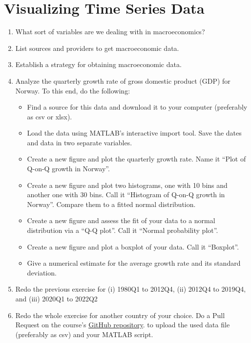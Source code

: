 \section[Visualizing Time Series Data]{Visualizing Time Series Data\label{ex:VisualizingTimeSeriesData}}

\begin{enumerate}
\item What sort of variables are we dealing with in macroeconomics?
\item List sources and providers to get macroeconomic data.
\item Establish a strategy for obtaining macroeconomic data.
\item Analyze the quarterly growth rate of gross domestic product (GDP) for Norway.
To this end, do the following:
\begin{itemize}
	\item Find a source for this data and download it to your computer (preferably as csv or xlsx).
	\item Load the data using MATLAB's interactive import tool. Save the dates and data in two separate variables.
	\item Create a new figure and plot the quarterly growth rate.
	Name it \enquote{Plot of Q-on-Q growth in Norway}.
	\item Create a new figure and plot two histograms, one with 10 bins and another one with 30 bins.
	Call it \enquote{Histogram of Q-on-Q growth in Norway}. Compare them to a fitted normal distribution.
	\item Create a new figure and assess the fit of your data to a normal distribution via a \enquote{Q-Q plot}.
	Call it \enquote{Normal probability plot}.
	\item Create a new figure and plot a boxplot of your data.
	Call it \enquote{Boxplot}.
	\item Give a numerical estimate for the average growth rate and its standard deviation.
\end{itemize}
\item Redo the previous exercise for (i) 1980Q1 to 2012Q4, (ii) 2012Q4 to 2019Q4, and (iii) 2020Q1 to 2022Q2
\item Redo the whole exercise for another country of your choice.
Do a Pull Request on the course's \href{https://github.com/wmutschl/Quantitative-Macroeconomics}{GitHub repository}.
  to upload the used data file (preferably as csv) and your MATLAB script.
\end{enumerate}

